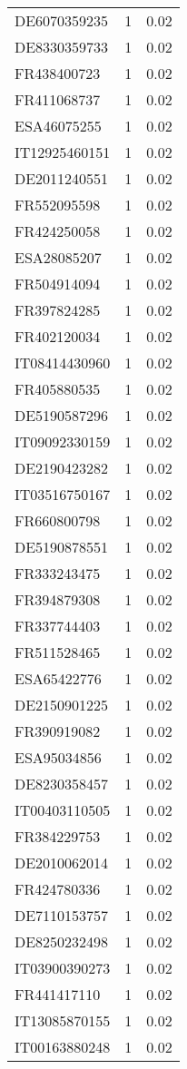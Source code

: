 \begin{table*}[htbp]
\begin{tabular}{lrr}
DE6070359235 & 1 & 0.02 \\
DE8330359733 & 1 & 0.02 \\
FR438400723 & 1 & 0.02 \\
FR411068737 & 1 & 0.02 \\
ESA46075255 & 1 & 0.02 \\
IT12925460151 & 1 & 0.02 \\
DE2011240551 & 1 & 0.02 \\
FR552095598 & 1 & 0.02 \\
FR424250058 & 1 & 0.02 \\
ESA28085207 & 1 & 0.02 \\
FR504914094 & 1 & 0.02 \\
FR397824285 & 1 & 0.02 \\
FR402120034 & 1 & 0.02 \\
IT08414430960 & 1 & 0.02 \\
FR405880535 & 1 & 0.02 \\
DE5190587296 & 1 & 0.02 \\
IT09092330159 & 1 & 0.02 \\
DE2190423282 & 1 & 0.02 \\
IT03516750167 & 1 & 0.02 \\
FR660800798 & 1 & 0.02 \\
DE5190878551 & 1 & 0.02 \\
FR333243475 & 1 & 0.02 \\
FR394879308 & 1 & 0.02 \\
FR337744403 & 1 & 0.02 \\
FR511528465 & 1 & 0.02 \\
ESA65422776 & 1 & 0.02 \\
DE2150901225 & 1 & 0.02 \\
FR390919082 & 1 & 0.02 \\
ESA95034856 & 1 & 0.02 \\
DE8230358457 & 1 & 0.02 \\
IT00403110505 & 1 & 0.02 \\
FR384229753 & 1 & 0.02 \\
DE2010062014 & 1 & 0.02 \\
FR424780336 & 1 & 0.02 \\
DE7110153757 & 1 & 0.02 \\
DE8250232498 & 1 & 0.02 \\
IT03900390273 & 1 & 0.02 \\
FR441417110 & 1 & 0.02 \\
IT13085870155 & 1 & 0.02 \\
IT00163880248 & 1 & 0.02 \\

\end{tabular}
\end{table*}
